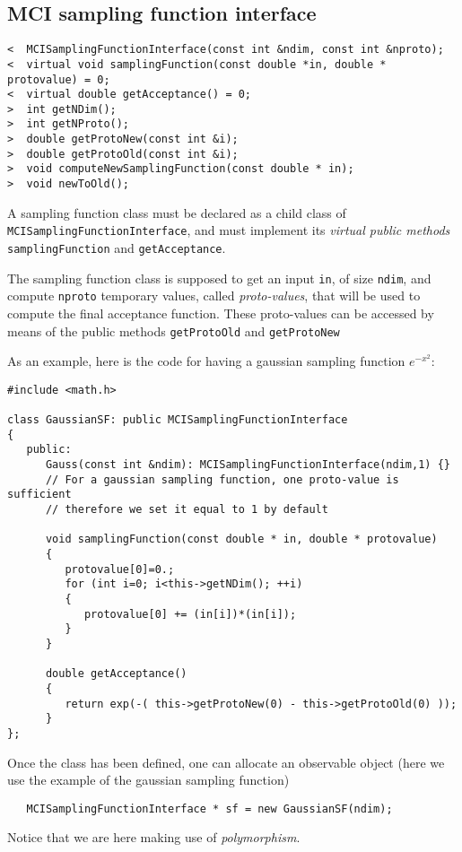 \documentclass[11pt,a4paper,twoside]{article}
\begin{document}
\subsection{MCI sampling function interface} %
\label{sub:mci_sampling_function_interface}

\begin{verbatim}
<  MCISamplingFunctionInterface(const int &ndim, const int &nproto);
<  virtual void samplingFunction(const double *in, double * protovalue) = 0;
<  virtual double getAcceptance() = 0;
>  int getNDim();
>  int getNProto();
>  double getProtoNew(const int &i);
>  double getProtoOld(const int &i);
>  void computeNewSamplingFunction(const double * in);
>  void newToOld();
\end{verbatim}

A sampling function class must be declared as a child class of \verb+MCISamplingFunctionInterface+, and must implement its \emph{virtual public methods} \verb+samplingFunction+ and \verb+getAcceptance+.

The sampling function class is supposed to get an input \verb+in+, of size \verb+ndim+, and compute \verb+nproto+ temporary values, called \emph{proto-values}, that will be used to compute the final acceptance function.
These proto-values can be accessed by means of the public methods \verb+getProtoOld+ and \verb+getProtoNew+

As an example, here is the code for having a gaussian sampling function $e^{-x^2}$:
\begin{verbatim}
#include <math.h>

class GaussianSF: public MCISamplingFunctionInterface
{
   public:
      Gauss(const int &ndim): MCISamplingFunctionInterface(ndim,1) {}
      // For a gaussian sampling function, one proto-value is sufficient
      // therefore we set it equal to 1 by default

      void samplingFunction(const double * in, double * protovalue)
      {
         protovalue[0]=0.;
         for (int i=0; i<this->getNDim(); ++i)
         {
            protovalue[0] += (in[i])*(in[i]);
         }
      }

      double getAcceptance()
      {
         return exp(-( this->getProtoNew(0) - this->getProtoOld(0) ));
      }
};
\end{verbatim}

Once the class has been defined, one can allocate an observable object (here we use the example of the gaussian sampling function)
\begin{verbatim}
   MCISamplingFunctionInterface * sf = new GaussianSF(ndim);
\end{verbatim}
Notice that we are here making use of \emph{polymorphism}.
\end{document}
